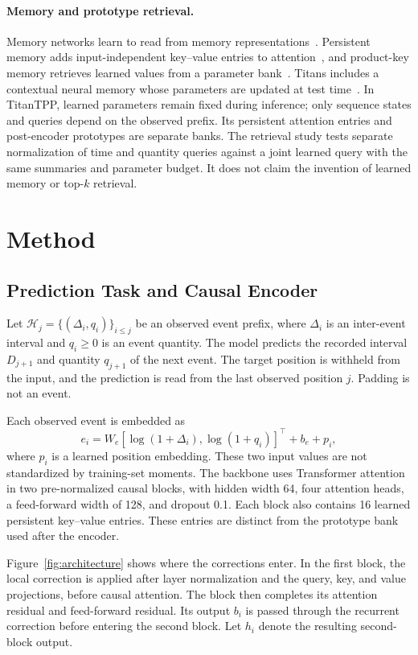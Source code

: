\documentclass[runningheads]{llncs}
\newcommand{\method}{TitanTPP}
\newcommand{\Hcal}{\mathcal{H}}
\begin{document}
\paragraph{Memory and prototype retrieval.}
Memory networks learn to read from memory representations~\cite{sukhbaatar2015memory}. Persistent memory adds input-independent key--value entries to attention~\cite{sukhbaatar2019memory}, and product-key memory retrieves learned values from a parameter bank~\cite{lample2019product}. Titans includes a contextual neural memory whose parameters are updated at test time~\cite{behrouz2025titans}. In \method, learned parameters remain fixed during inference; only sequence states and queries depend on the observed prefix. Its persistent attention entries and post-encoder prototypes are separate banks. The retrieval study tests separate normalization of time and quantity queries against a joint learned query with the same summaries and parameter budget. It does not claim the invention of learned memory or top-$k$ retrieval.

\section{Method}
\subsection{Prediction Task and Causal Encoder}
Let $\Hcal_j=\{(\Delta_i,q_i)\}_{i\leq j}$ be an observed event prefix, where $\Delta_i$ is an inter-event interval and $q_i\geq0$ is an event quantity. The model predicts the recorded interval $D_{j+1}$ and quantity $q_{j+1}$ of the next event. The target position is withheld from the input, and the prediction is read from the last observed position $j$. Padding is not an event.

Each observed event is embedded as
\begin{equation}
 e_i=W_e[\log(1+\Delta_i),\log(1+q_i)]^\top+b_e+p_i,
\end{equation}
where $p_i$ is a learned position embedding. These two input values are not standardized by training-set moments. The backbone uses Transformer attention~\cite{vaswani2017attention} in two pre-normalized causal blocks, with hidden width 64, four attention heads, a feed-forward width of 128, and dropout 0.1. Each block also contains 16 learned persistent key--value entries. These entries are distinct from the prototype bank used after the encoder.

Figure~\ref{fig:architecture} shows where the corrections enter. In the first block, the local correction is applied after layer normalization and the query, key, and value projections, before causal attention. The block then completes its attention residual and feed-forward residual. Its output $b_i$ is passed through the recurrent correction before entering the second block. Let $h_i$ denote the resulting second-block output.
\end{document}
